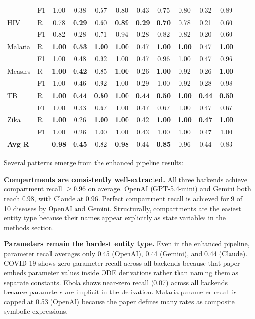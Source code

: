 \begin{table}[t]
\begin{tabular}{llccccccccc}
           & F1 & 1.00 & 0.38 & 0.57 & 0.80 & 0.43 & 0.75 & 0.80 & 0.32 & 0.89 \\
HIV        & R  & 0.78 & \textbf{0.29} & 0.60 & \textbf{0.89} & \textbf{0.29} & \textbf{0.70} & 0.78 & 0.21 & 0.60 \\
           & F1 & 0.82 & 0.28 & 0.71 & 0.94 & 0.28 & 0.82 & 0.82 & 0.20 & 0.60 \\
Malaria    & R  & \textbf{1.00} & \textbf{0.53} & \textbf{1.00} & \textbf{1.00} & 0.47 & \textbf{1.00} & \textbf{1.00} & 0.47 & \textbf{1.00} \\
           & F1 & 1.00 & 0.48 & 0.92 & 1.00 & 0.47 & 0.96 & 1.00 & 0.47 & 0.96 \\
Measles    & R  & \textbf{1.00} & \textbf{0.42} & 0.85 & \textbf{1.00} & 0.26 & \textbf{1.00} & 0.92 & 0.26 & \textbf{1.00} \\
           & F1 & 1.00 & 0.46 & 0.92 & 1.00 & 0.29 & 1.00 & 0.92 & 0.28 & 0.98 \\
TB         & R  & \textbf{1.00} & \textbf{0.44} & \textbf{0.50} & \textbf{1.00} & \textbf{0.44} & \textbf{0.50} & \textbf{1.00} & \textbf{0.44} & \textbf{0.50} \\
           & F1 & 1.00 & 0.33 & 0.67 & 1.00 & 0.47 & 0.67 & 1.00 & 0.47 & 0.67 \\
Zika       & R  & \textbf{1.00} & 0.26 & \textbf{1.00} & \textbf{1.00} & 0.42 & \textbf{1.00} & \textbf{1.00} & \textbf{0.47} & \textbf{1.00} \\
           & F1 & 1.00 & 0.26 & 1.00 & 1.00 & 0.43 & 1.00 & 1.00 & 0.47 & 1.00 \\
\midrule
\textbf{Avg R} & & \textbf{0.98} & \textbf{0.45} & 0.82 & \textbf{0.98} & 0.44 & \textbf{0.85} & 0.96 & 0.44 & 0.83 \\
\bottomrule
\end{tabular}
\end{table}

Several patterns emerge from the enhanced pipeline results:

\noindent\textbf{Compartments are consistently well-extracted.}
All three backends achieve compartment recall $\geq 0.96$ on average.
OpenAI (GPT-5.4-mini) and Gemini both reach 0.98, with Claude at 0.96.
Perfect compartment recall is achieved for 9 of 10 diseases by OpenAI and Gemini.
Structurally, compartments are the easiest entity type because their names appear
explicitly as state variables in the methods section.

\noindent\textbf{Parameters remain the hardest entity type.}
Even in the enhanced pipeline, parameter recall averages only 0.45 (OpenAI), 0.44
(Gemini), and 0.44 (Claude). COVID-19 shows zero parameter recall across all backends
because that paper embeds parameter values inside ODE derivations rather than naming
them as separate constants. Ebola shows near-zero recall (0.07) across all backends
because parameters are implicit in the derivation. Malaria parameter recall is capped
at 0.53 (OpenAI) because the paper defines many rates as composite symbolic expressions.

